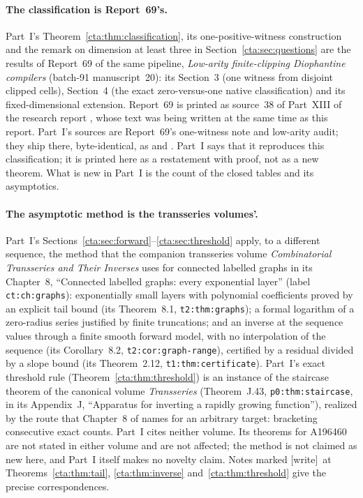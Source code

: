 \documentclass[11pt]{article}
\theoremstyle{definition}
\theoremstyle{remark}
\newcommand{\wtag}{\textup{[write]}}
\begin{document}
\paragraph{The classification is Report~69's.} Part~I's
Theorem~\ref{cta:thm:classification}, its one-positive-witness construction
and the remark on dimension at least three in
Section~\ref{cta:sec:questions} are the results of Report~69 of the same
pipeline, \emph{Low-arity finite-clipping Diophantine compilers}
(batch-91 manuscript~20): its Section~3 (one witness from disjoint clipped
cells), Section~4 (the exact zero-versus-one native classification) and
its fixed-dimensional extension. Report~69 is printed as source~38 of
Part~XIII of the research report
\cite{smc}, whose text was being written at the same time as this report.
Part~I's sources \cite{native,lowaudit} are Report~69's one-witness note
and low-arity audit; they ship there, byte-identical, as
 and
. Part~I says that it reproduces this
classification; it is printed here as a restatement with proof, not as a
new theorem. What is new in Part~I is the count of the closed tables and
its asymptotics.

\paragraph{The asymptotic method is the transseries volumes'.} Part~I's
Sections~\ref{cta:sec:forward}--\ref{cta:sec:threshold} apply, to a
different sequence, the method that the companion transseries volume
\emph{Combinatorial Transseries and Their Inverses} \cite{cti} uses for
connected labelled graphs in its Chapter~8, ``Connected labelled graphs:
every exponential layer'' (label \texttt{ct:ch:graphs}): exponentially
small layers with polynomial coefficients proved by an explicit tail bound
(its Theorem~8.1, \texttt{t2:thm:graphs}); a formal logarithm of a
zero-radius series justified by finite truncations; and an inverse at the
sequence values through a finite smooth forward model, with no
interpolation of the sequence (its Corollary~8.2,
\texttt{t2:cor:graph-range}), certified by a residual divided by a slope
bound (its Theorem~2.12, \texttt{t1:thm:certificate}). Part~I's exact
threshold rule (Theorem~\ref{cta:thm:threshold}) is an instance of the
staircase theorem of the canonical volume \emph{Transseries} \cite{tsvol}
(Theorem~J.43, \texttt{p0:thm:staircase}, in its Appendix~J, ``Apparatus
for inverting a rapidly growing function''), realized by the route that
Chapter~8 of \cite{cti} names for an arbitrary target: bracketing
consecutive exact counts. Part~I cites neither volume. Its theorems for
A196460 are not stated in either volume and are not affected; the method
is not claimed as new here, and Part~I itself makes no novelty claim.
Notes marked \wtag\ at Theorems~\ref{cta:thm:tail},
\ref{cta:thm:inverse} and~\ref{cta:thm:threshold} give the precise
correspondences.
\end{document}

